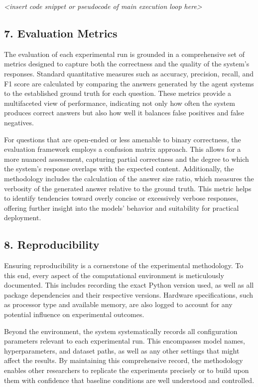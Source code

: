             \textit{<insert code snippet or pseudocode of main execution loop here>}

        \subsection{7. Evaluation Metrics}

            The evaluation of each experimental run is grounded in a comprehensive set of metrics designed to capture both the correctness and the quality of the system’s responses. Standard quantitative measures such as accuracy, precision, recall, and F1 score are calculated by comparing the answers generated by the agent systems to the established ground truth for each question. These metrics provide a multifaceted view of performance, indicating not only how often the system produces correct answers but also how well it balances false positives and false negatives.

            For questions that are open-ended or less amenable to binary correctness, the evaluation framework employs a confusion matrix approach. This allows for a more nuanced assessment, capturing partial correctness and the degree to which the system’s response overlaps with the expected content. Additionally, the methodology includes the calculation of the answer size ratio, which measures the verbosity of the generated answer relative to the ground truth. This metric helps to identify tendencies toward overly concise or excessively verbose responses, offering further insight into the models’ behavior and suitability for practical deployment.

        \subsection{8. Reproducibility}

            Ensuring reproducibility is a cornerstone of the experimental methodology. To this end, every aspect of the computational environment is meticulously documented. This includes recording the exact Python version used, as well as all package dependencies and their respective versions. Hardware specifications, such as processor type and available memory, are also logged to account for any potential influence on experimental outcomes.

            Beyond the environment, the system systematically records all configuration parameters relevant to each experimental run. This encompasses model names, hyperparameters, and dataset paths, as well as any other settings that might affect the results. By maintaining this comprehensive record, the methodology enables other researchers to replicate the experiments precisely or to build upon them with confidence that baseline conditions are well understood and controlled.

